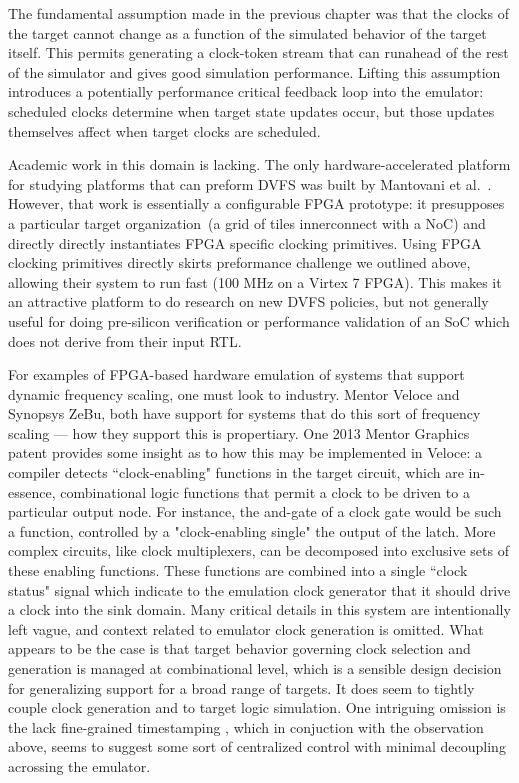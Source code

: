 
The fundamental assumption made in the previous chapter was that the clocks of
the target cannot change as a function of the simulated behavior of the target
itself. This permits generating a clock-token stream that can runahead of the
rest of the simulator and gives good simulation performance. Lifting this
assumption introduces a potentially performance critical feedback loop into the
emulator: scheduled clocks determine when target state updates occur, but those
updates themselves affect when target clocks are scheduled.

Academic work in this domain is lacking. The only hardware-accelerated platform
for studying platforms that can preform DVFS was built by Mantovani et
al.~\cite{DVFSPrototype}. However, that work is essentially a configurable FPGA
prototype: it presupposes a particular target organization~(a grid of tiles
innerconnect with a NoC) and directly directly instantiates FPGA specific
clocking primitives. Using FPGA clocking primitives directly skirts preformance
challenge we outlined above, allowing their system to run fast (100 MHz on a
Virtex 7 FPGA). This makes it an attractive platform to do research on new
DVFS policies, but not generally useful for doing pre-silicon verification or
performance validation of an SoC which does not derive from their input RTL.

For examples of FPGA-based hardware emulation of systems that support dynamic
frequency scaling, one must look to industry. Mentor Veloce and Synopsys ZeBu,
both have support for systems that do this sort of frequency scaling --- how
they support this is propertiary. One 2013 Mentor Graphics patent provides some
insight as to how this may be implemented in Veloce: a compiler detects
``clock-enabling" functions in the target circuit, which are in-essence,
combinational logic functions that permit a clock to be driven to a particular
output node. For instance, the and-gate of a clock gate would be such a
function, controlled by a "clock-enabling single" the output of the latch. More
complex circuits, like clock multiplexers, can be decomposed into exclusive
sets of these enabling functions. These functions are combined into a single
``clock status" signal which indicate to the emulation clock generator that it
should drive a clock into the sink domain. Many critical details in this system
are intentionally left vague, and context related to emulator clock generation
is omitted.  What appears to be the case is that target behavior governing
clock selection and generation is managed at combinational level, which is a
sensible design decision for generalizing support for a broad range of targets.
It does seem to tightly couple clock generation and to target logic simulation.
One intriguing omission is the lack fine-grained timestamping , which in
conjuction with the observation above, seems to suggest some sort of
centralized control with minimal decoupling acrossing the emulator.


